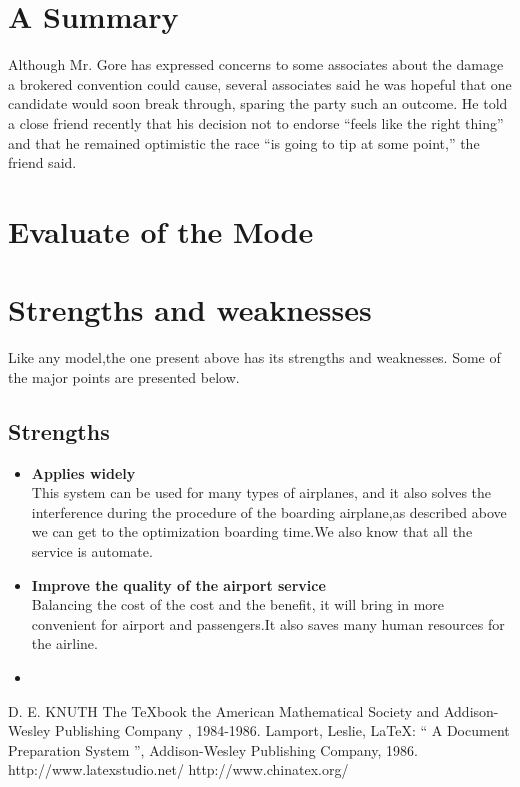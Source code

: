 \section{A Summary    }
Although Mr. Gore has expressed concerns to some associates about
the damage a brokered convention could cause, several associates
said he was hopeful that one candidate would soon break through,
sparing the party such an outcome. He told a close friend recently
that his decision not to endorse ``feels like the right thing''
and that he remained optimistic the race ``is going to tip at some
point,'' the friend said.
\section{Evaluate of the Mode}

\section{Strengths and weaknesses}
Like any model,the one present above has its strengths and
weaknesses. Some of the major points are presented below.

\subsection{Strengths}
\begin{itemize}
\item \textbf{Applies widely}\\
This  system can be used for many types of airplanes, and it also
solves the interference during  the procedure of the boarding
airplane,as described above we can get to the  optimization
boarding time.We also know that all the service is automate.
\item \textbf{Improve the quality of the airport service}\\
Balancing the cost of the cost and the benefit, it will bring in
more convenient  for airport and passengers.It also saves many
human resources for the airline. \item \textbf{}
\end{itemize}




\begin{thebibliography}{99}
 D. E. KNUTH   The \TeX{}book  the American
Mathematical Society and Addison-Wesley
Publishing Company , 1984-1986.
Lamport, Leslie,  \LaTeX{}: `` A Document Preparation System '',
Addison-Wesley Publishing Company, 1986.
http://www.latexstudio.net/
http://www.chinatex.org/
\end{thebibliography}
